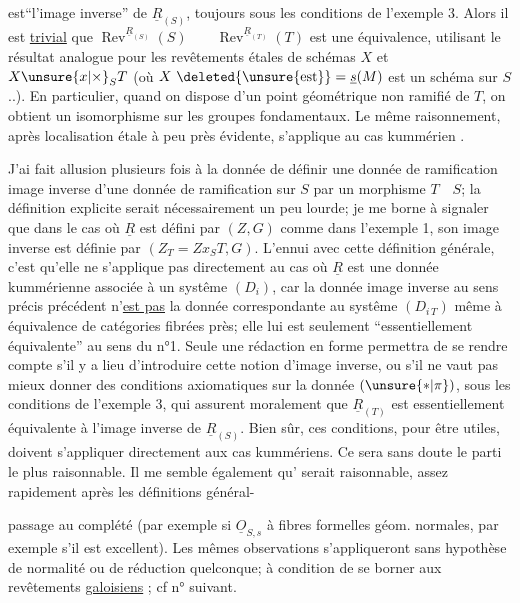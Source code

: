 
est``l'image inverse'' de $\underline{R}_{(S)}$, toujours sous les conditions de l'exemple 3. Alors il est \uline{trivial} que $\operatorname{Rev}^{\underline{R}_{(S)}}(S)\qquad\operatorname{Rev}^{\underline{R}_{(T)}}(T)$ est une équivalence, utilisant le résultat analogue pour les revêtements étales de schémas $X$ et $X\unsure{x|\times}_{S}T$ (où $X\ \deleted{\unsure{\mathrm{est}}}=\underline{s}(M)$ est un schéma  sur $S$ ..). En particulier, quand on dispose d'un point géométrique non ramifié de $T$, on obtient un isomorphisme sur les groupes fondamentaux. Le même raisonnement, après localisation étale à peu près évidente, s'applique au cas kummérien .

J'ai fait allusion plusieurs fois à la donnée de définir une donnée de ramification image inverse d'une donnée de ramification sur $S$ par un morphisme $T\quad S$; la définition explicite serait nécessairement un peu lourde; je me borne à signaler que dans le cas où $\underline{R}$ est défini par $(Z,G)$ comme dans l'exemple 1, son image inverse est définie par $(Z_T=Zx_ST,G)$. L'ennui avec cette définition générale, c'est qu'elle ne s'applique pas directement au cas où $\underline{R}$ est une donnée kummérienne associée à un systême $(D_i)$, car la donnée image inverse au sens précis précédent n'\uline{est pas} la donnée correspondante au systême $(D_{i\,T})$ même à équivalence de catégories fibrées près; elle lui est seulement ``essentiellement équivalente'' au sens du n°1. Seule une rédaction en forme permettra de se rendre compte s'il y a lieu d'introduire cette notion d'image inverse, ou s'il ne vaut pas mieux donner des conditions axiomatiques sur la donnée $(\unsure{*|\pi})$, sous les conditions de l'exemple 3, qui assurent moralement que $\underline{R}_{(T)}$ est essentiellement équivalente à l'image inverse de $\underline{R}_{(S)}$. Bien sûr, ces conditions, pour  être utiles, doivent s'appliquer directement aux cas kummériens. Ce sera sans doute le parti le plus raisonnable. Il me semble également qu' serait raisonnable, assez rapidement après les définitions général-

passage au complété (par exemple si $\underline{O}_{S,s}$ à fibres formelles géom. normales, par exemple s'il est excellent). Les mêmes observations s'appliqueront sans hypothèse de normalité ou de réduction quelconque; à condition de se borner aux revêtements  \uline{galoisiens} ; cf n° suivant.

